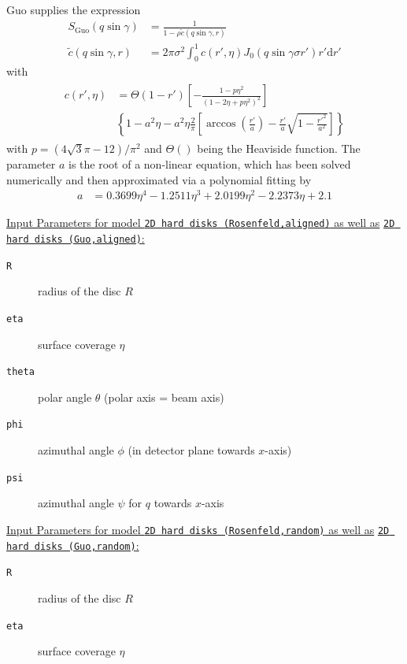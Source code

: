 Guo \cite{Guo2006} supplies the expression
\begin{align}
S_\mathrm{Guo}(q\sin\gamma) &= \frac{1}{1-\rho \tilde{c}(q\sin\gamma,r)} \\
\tilde{c}(q\sin\gamma,r) &= 2\pi\sigma^2 \int_0^1 c(r',\eta) J_0(q\sin\gamma\sigma r') r' \mathrm{d}r'
\end{align}
with
\begin{align}
\begin{split}
c(r',\eta) &=
\Theta(1-r') \left[-\frac{1-p\eta^2}{\left(1-2\eta+p\eta^2\right)^2}\right]  \\
&\left\{1-a^2\eta-a^2\eta\frac{2}{\pi}\left[\arccos\left(\frac{r'}{a}\right)-\frac{r'}{a}\sqrt{1-\frac{r'^2}{a^2}}\right]\right\}
\end{split}
\end{align}
with $p=\left(4\sqrt{3}\pi-12\right)/\pi^2$ and $\Theta()$ being the Heaviside function. The parameter $a$ is the root of a non-linear equation, which has been solved numerically and then approximated via a polynomial fitting by
\begin{align}
a &= 0.3699\eta^4
      -1.2511\eta^3
      +2.0199\eta^2
      -2.2373\eta
      +2.1
\end{align}

\vspace{5mm}
\noindent
\underline{Input Parameters for model \texttt{2D hard disks (Rosenfeld,aligned)} as well as}
\underline{\texttt{2D hard disks (Guo,aligned)}:}\\
\begin{description}
\item[\texttt{R}] radius of the disc $R$
\item[\texttt{eta}] surface coverage $\eta$
\item[\texttt{theta}] polar angle $\theta$ (polar axis = beam axis)
\item[\texttt{phi}] azimuthal angle $\phi$ (in detector plane towards $x$-axis)
\item[\texttt{psi}] azimuthal angle  $\psi$ for $q$ towards $x$-axis
\end{description}

\vspace{5mm}
\noindent
\underline{Input Parameters for model \texttt{2D hard disks (Rosenfeld,random)} as well as}
\underline{\texttt{2D hard disks (Guo,random)}:}\\
\begin{description}
\item[\texttt{R}] radius of the disc $R$
\item[\texttt{eta}] surface coverage $\eta$
\end{description}

